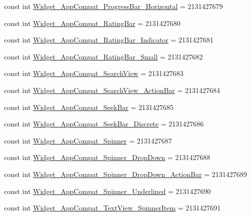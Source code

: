 \begin{CompactItemize}
const int \hyperlink{class__2doo_1_1_droid_1_1_resource_1_1_style_26b699232467f1afd0174b838414a779}{Widget\_\-AppCompat\_\-ProgressBar\_\-Horizontal} = 2131427679
\item 
const int \hyperlink{class__2doo_1_1_droid_1_1_resource_1_1_style_5bacbbdf0827b4554be4046ba50af590}{Widget\_\-AppCompat\_\-RatingBar} = 2131427680
\item 
const int \hyperlink{class__2doo_1_1_droid_1_1_resource_1_1_style_e88372358159fa829609ae28b6970e03}{Widget\_\-AppCompat\_\-RatingBar\_\-Indicator} = 2131427681
\item 
const int \hyperlink{class__2doo_1_1_droid_1_1_resource_1_1_style_65f97ab2ca75faff126694be32436c31}{Widget\_\-AppCompat\_\-RatingBar\_\-Small} = 2131427682
\item 
const int \hyperlink{class__2doo_1_1_droid_1_1_resource_1_1_style_ebbfd7c3c882b82721ea5027f8c9d280}{Widget\_\-AppCompat\_\-SearchView} = 2131427683
\item 
const int \hyperlink{class__2doo_1_1_droid_1_1_resource_1_1_style_6ff29aae8d3f6bd5e5db49a22e9bfa6c}{Widget\_\-AppCompat\_\-SearchView\_\-ActionBar} = 2131427684
\item 
const int \hyperlink{class__2doo_1_1_droid_1_1_resource_1_1_style_8037f93216e05f902bbb53e06ff7d410}{Widget\_\-AppCompat\_\-SeekBar} = 2131427685
\item 
const int \hyperlink{class__2doo_1_1_droid_1_1_resource_1_1_style_983972989bbafffc1625c6fe7b8ba821}{Widget\_\-AppCompat\_\-SeekBar\_\-Discrete} = 2131427686
\item 
const int \hyperlink{class__2doo_1_1_droid_1_1_resource_1_1_style_7125722a3efbfc8473a590c213bb6be4}{Widget\_\-AppCompat\_\-Spinner} = 2131427687
\item 
const int \hyperlink{class__2doo_1_1_droid_1_1_resource_1_1_style_164ca84ab52b9de55ddaf87c5c507a73}{Widget\_\-AppCompat\_\-Spinner\_\-DropDown} = 2131427688
\item 
const int \hyperlink{class__2doo_1_1_droid_1_1_resource_1_1_style_e5d861cba685e1947f177a26d7e6442b}{Widget\_\-AppCompat\_\-Spinner\_\-DropDown\_\-ActionBar} = 2131427689
\item 
const int \hyperlink{class__2doo_1_1_droid_1_1_resource_1_1_style_8e7d5e0dcad8022742d48ec63394eb21}{Widget\_\-AppCompat\_\-Spinner\_\-Underlined} = 2131427690
\item 
const int \hyperlink{class__2doo_1_1_droid_1_1_resource_1_1_style_a6d773fd0d44d37b5ef5f72e6d937f92}{Widget\_\-AppCompat\_\-TextView\_\-SpinnerItem} = 2131427691
\item 

\end{CompactItemize}
